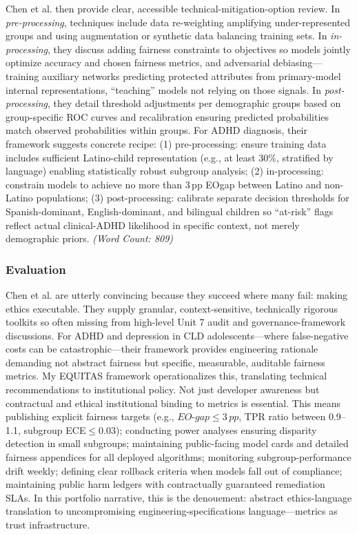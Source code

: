 \documentclass[11pt,twoside]{article}
\DeclareRobustCommand{\EOgap}{EO\text{-}gap\xspace}
\DeclareRobustCommand{\TPR}{TPR\xspace}
\DeclareRobustCommand{\ECE}{ECE\xspace}
\DeclareRobustCommand{\pp}{pp\xspace} %
\begin{document}
Chen et al. then provide clear, accessible technical-mitigation-option review. In \textit{pre-processing}, techniques include data re-weighting amplifying under-represented groups and using augmentation or synthetic data balancing training sets. In \textit{in-processing}, they discuss adding fairness constraints to objectives so models jointly optimize accuracy and chosen fairness metrics, and adversarial debiasing---training auxiliary networks predicting protected attributes from primary-model internal representations, ``teaching'' models not relying on those signals. In \textit{post-processing}, they detail threshold adjustments per demographic groups based on group-specific ROC curves and recalibration ensuring predicted probabilities match observed probabilities within groups. For ADHD diagnosis, their framework suggests concrete recipe: (1) pre-processing: ensure training data includes sufficient Latino-child representation (e.g., at least 30\%, stratified by language) enabling statistically robust subgroup analysis; (2) in-processing: constrain models to achieve no more than 3\,\pp \EOgap between Latino and non-Latino populations; (3) post-processing: calibrate separate decision thresholds for Spanish-dominant, English-dominant, and bilingual children so ``at-risk'' flags reflect actual clinical-ADHD likelihood in specific context, not merely demographic priors. \textit{(Word Count: 809)}

\newpage

\subsubsection*{Evaluation}

\vspace{-0.3cm}

Chen et al. are utterly convincing because they succeed where many fail: making ethics executable. They supply granular, context-sensitive, technically rigorous toolkits so often missing from high-level Unit 7 audit and governance-framework discussions. For ADHD and depression in CLD adolescents---where false-negative costs can be catastrophic---their framework provides engineering rationale demanding not abstract fairness but specific, measurable, auditable fairness metrics. My \textsc{EQUITAS} framework operationalizes this, translating technical recommendations to institutional policy. Not just developer awareness but contractual and ethical institutional binding to metrics is essential. This means publishing explicit fairness targets (e.g., $\EOgap \le 3\,\pp$, \TPR ratio between 0.9--1.1, subgroup \ECE $\le 0.03$); conducting power analyses ensuring disparity detection in small subgroups; maintaining public-facing model cards and detailed fairness appendices for all deployed algorithms; monitoring subgroup-performance drift weekly; defining clear rollback criteria when models fall out of compliance; maintaining public harm ledgers with contractually guaranteed remediation SLAs. In this portfolio narrative, this is the denouement: abstract ethics-language translation to uncompromising engineering-specifications language---metrics as trust infrastructure.
\end{document}
